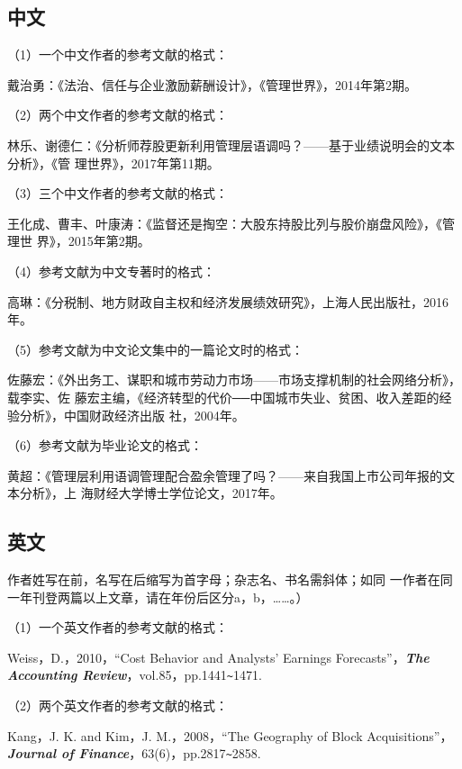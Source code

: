 \documentclass{article}
\begin{document}
\subsection{中文}
（1）一个中文作者的参考文献的格式：

戴治勇：《法治、信任与企业激励薪酬设计》，《管理世界》，2014年第2期。

（2）两个中文作者的参考文献的格式：

林乐、谢德仁：《分析师荐股更新利用管理层语调吗？——基于业绩说明会的文本分析》，《管
理世界》，2017年第11期。

（3）三个中文作者的参考文献的格式：

王化成、曹丰、叶康涛：《监督还是掏空：大股东持股比列与股价崩盘风险》，《管理世
界》，2015年第2期。

（4）参考文献为中文专著时的格式：

高琳：《分税制、地方财政自主权和经济发展绩效研究》，上海人民出版社，2016年。

（5）参考文献为中文论文集中的一篇论文时的格式：

佐藤宏：《外出务工、谋职和城市劳动力市场——市场支撑机制的社会网络分析》，载李实、佐
藤宏主编，《经济转型的代价──中国城市失业、贫困、收入差距的经验分析》，中国财政经济出版
社，2004年。

（6）参考文献为毕业论文的格式：

黄超：《管理层利用语调管理配合盈余管理了吗？——来自我国上市公司年报的文本分析》，上
海财经大学博士学位论文，2017年。

\subsection{英文}


作者姓写在前，名写在后缩写为首字母；杂志名、书名需斜体；如同
一作者在同一年刊登两篇以上文章，请在年份后区分a，b，……。）

（1）一个英文作者的参考文献的格式：

Weiss，D.，2010，“Cost Behavior and Analysts’ Earnings Forecasts”，\textbf{\textit{The
Accounting Review}}，vol.85，pp.1441\verb|~|1471.

（2）两个英文作者的参考文献的格式：

Kang，J. K. and Kim，J. M.，2008，“The Geography of Block Acquisitions”，\textbf{\textit{Journal
of Finance}}，63(6)，pp.2817\verb|~|2858.
\end{document}

